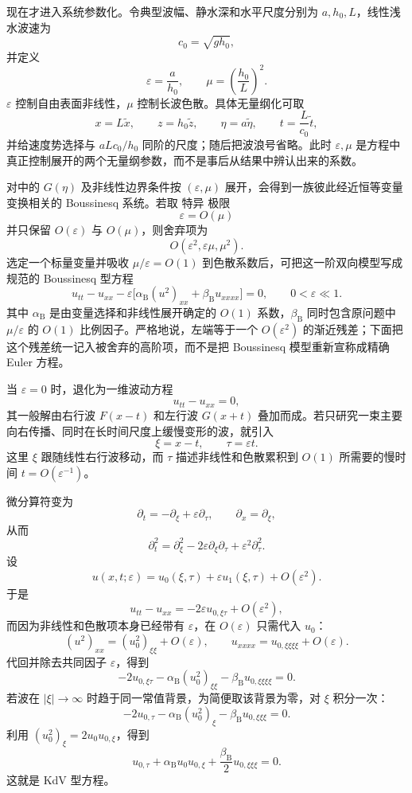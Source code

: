 现在才进入系统参数化。令典型波幅、静水深和水平尺度分别为 $a,h_0,L$，线性浅水波速为
\[
c_0=\sqrt{gh_0},
\]
并定义
\begin{equation*}{
\varepsilon=\frac{a}{h_0},
\qquad
\mu=\left(\frac{h_0}{L}\right)^2
}.\end{equation*}
$\varepsilon$ 控制自由表面非线性，$\mu$ 控制长波色散。具体无量纲化可取
\[
x=L\tilde x,
\qquad z=h_0\tilde z,
\qquad \eta=a\tilde\eta,
\qquad t=\frac{L}{c_0}\tilde t,
\]
并给速度势选择与 $aLc_0/h_0$ 同阶的尺度；随后把波浪号省略。此时 $\varepsilon,\mu$ 是方程中真正控制展开的两个无量纲参数，而不是事后从结果中辨认出来的系数。

对中的 $G(\eta)$ 及非线性边界条件按 $(\varepsilon,\mu)$ 展开，会得到一族彼此经近恒等变量变换相关的 Boussinesq 系统。若取 特异 极限
\[
\varepsilon=O(\mu)
\]
并只保留 $O(\varepsilon)$ 与 $O(\mu)$，则舍弃项为
\[
O(\varepsilon^2,\varepsilon\mu,\mu^2).
\]
选定一个标量变量并吸收 $\mu/\varepsilon=O(1)$ 到色散系数后，可把这一阶双向模型写成规范的 Boussinesq 型方程
\begin{equation}
{
u_{tt}-u_{xx}
-\varepsilon\Big[\alpha_{\mathrm B}(u^2)_{xx}+\beta_{\mathrm B}u_{xxxx}\Big]=0,
\qquad 0<\varepsilon\ll1
}.
\label{eq:boussinesq-canonical}
\end{equation}
其中 $\alpha_{\mathrm B}$ 是由变量选择和非线性展开确定的 $O(1)$ 系数，$\beta_{\mathrm B}$ 同时包含原问题中 $\mu/\varepsilon$ 的 $O(1)$ 比例因子。严格地说，左端等于一个 $O(\varepsilon^2)$ 的渐近残差；下面把这个残差统一记入被舍弃的高阶项，而不是把 Boussinesq 模型重新宣称成精确 Euler 方程。

当 $\varepsilon=0$ 时，退化为一维波动方程
\[
u_{tt}-u_{xx}=0,
\]
其一般解由右行波 $F(x-t)$ 和左行波 $G(x+t)$ 叠加而成。若只研究一束主要向右传播、同时在长时间尺度上缓慢变形的波，就引入
\[
\xi=x-t,
\qquad
\tau=\varepsilon t.
\]
这里 $\xi$ 跟随线性右行波移动，而 $\tau$ 描述非线性和色散累积到 $O(1)$ 所需要的慢时间 $t=O(\varepsilon^{-1})$。

微分算符变为
\[
\partial_t=-\partial_\xi+\varepsilon\partial_\tau,
\qquad
\partial_x=\partial_\xi,
\]
从而
\[
\partial_t^2
=\partial_\xi^2-2\varepsilon\partial_\xi\partial_\tau
+\varepsilon^2\partial_\tau^2.
\]
设
\[
u(x,t;\varepsilon)=u_0(\xi,\tau)+\varepsilon u_1(\xi,\tau)+O(\varepsilon^2).
\]
于是
\[
u_{tt}-u_{xx}=-2\varepsilon u_{0,\xi\tau}+O(\varepsilon^2),
\]
而因为非线性和色散项本身已经带有 $\varepsilon$，在 $O(\varepsilon)$ 只需代入 $u_0$：
\[
(u^2)_{xx}=(u_0^2)_{\xi\xi}+O(\varepsilon),
\qquad
u_{xxxx}=u_{0,\xi\xi\xi\xi}+O(\varepsilon).
\]
代回并除去共同因子 $\varepsilon$，得到
\[
-2u_{0,\xi\tau}-\alpha_{\mathrm B}(u_0^2)_{\xi\xi}
-\beta_{\mathrm B}u_{0,\xi\xi\xi\xi}=0.
\]
若波在 $|\xi|\to\infty$ 时趋于同一常值背景，为简便取该背景为零，对 $\xi$ 积分一次：
\[
-2u_{0,\tau}-\alpha_{\mathrm B}(u_0^2)_\xi
-\beta_{\mathrm B}u_{0,\xi\xi\xi}=0.
\]
利用 $(u_0^2)_\xi=2u_0u_{0,\xi}$，得到
\begin{equation}
{
u_{0,\tau}+\alpha_{\mathrm B}u_0u_{0,\xi}
+\frac{\beta_{\mathrm B}}{2}u_{0,\xi\xi\xi}=0
}.
\label{eq:boussinesq-to-kdv}
\end{equation}
这就是 KdV 型方程。

